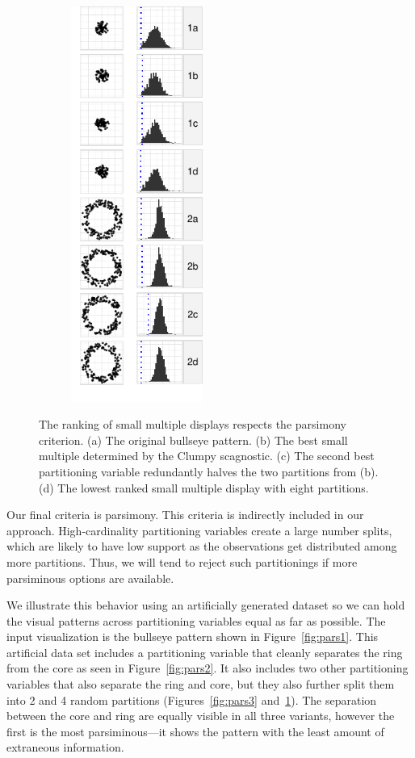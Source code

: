 \begin{figure}
    \begin{subfigure}[b]{1.7in}
	\includegraphics[width=1.7in]{images/5_12851615653375-cluster2.pdf}
      \caption{}
      \label{fig:pars4}
    \end{subfigure}
    \caption{The ranking of small multiple displays respects the parsimony criterion. (a) The original bullseye pattern. (b) The best small multiple determined by the Clumpy scagnostic. (c) The second best partitioning variable redundantly halves the two partitions from (b). (d) The lowest ranked small multiple display with eight partitions.}
    \label{fig:parsimonious}
  \end{figure}

Our final criteria is parsimony. This criteria is indirectly included in our approach. High-cardinality partitioning variables create a large number splits, which are likely to have low support as the observations get distributed among more partitions. Thus, we will tend to reject such partitionings if more parsiminous options are available.
 
We illustrate this behavior using an artificially generated dataset so we can hold the visual patterns across partitioning variables equal as far as possible. The input visualization is the bullseye pattern shown in Figure~\ref{fig:pars1}. This artificial data set includes a partitioning variable that cleanly separates the ring from the core as seen in Figure~\ref{fig:pars2}. It also includes two other partitioning variables that also separate the ring and core, but they also further split them into 2 and 4 random partitions (Figures~\ref{fig:pars3} and~\ref{fig:pars4}). The separation between the core and ring are equally visible in all three variants, however the first is the most parsiminous---it shows the pattern with the least amount of extraneous information.

